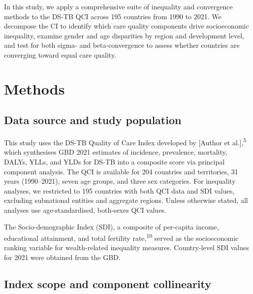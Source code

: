 \documentclass[12pt]{article}
\begin{document}
In this study, we apply a comprehensive suite of inequality and convergence methods to the DS-TB QCI across 195 countries from 1990 to 2021. We decompose the CI to identify which care quality components drive socioeconomic inequality, examine gender and age disparities by region and development level, and test for both sigma- and beta-convergence to assess whether countries are converging toward equal care quality.


\section{Methods}

\subsection{Data source and study population}

This study uses the DS-TB Quality of Care Index developed by [Author et al.],\textsuperscript{5} which synthesises GBD 2021 estimates of incidence, prevalence, mortality, DALYs, YLLs, and YLDs for DS-TB into a composite score via principal component analysis. The QCI is available for 204 countries and territories, 31 years (1990--2021), seven age groups, and three sex categories. For inequality analyses, we restricted to 195 countries with both QCI data and SDI values, excluding subnational entities and aggregate regions. Unless otherwise stated, all analyses use age-standardised, both-sexes QCI values.

The Socio-demographic Index (SDI), a composite of per-capita income, educational attainment, and total fertility rate,\textsuperscript{10} served as the socioeconomic ranking variable for wealth-related inequality measures. Country-level SDI values for 2021 were obtained from the GBD.

\subsection{Index scope and component collinearity}
\end{document}
